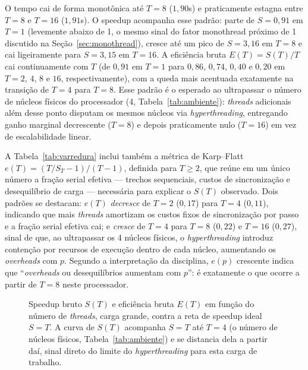 \documentclass[11pt,a4paper]{article}
\begin{document}
O tempo cai de forma monotônica até $T=8$ ($1{,}90$s) e praticamente estagna entre $T=8$ e $T=16$ ($1{,}91$s). O speedup acompanha esse padrão: parte de $S=0{,}91$ em $T=1$ (levemente abaixo de 1, o mesmo sinal do fator monothread próximo de 1 discutido na Seção~\ref{sec:monothread}), cresce até um pico de $S=3{,}16$ em $T=8$ e cai ligeiramente para $S=3{,}15$ em $T=16$. A eficiência bruta $E(T)=S(T)/T$ cai continuamente com $T$ (de $0{,}91$ em $T=1$ para $0{,}86$, $0{,}74$, $0{,}40$ e $0{,}20$ em $T=2$, $4$, $8$ e $16$, respectivamente), com a queda mais acentuada exatamente na transição de $T=4$ para $T=8$. Esse padrão é o esperado ao ultrapassar o número de núcleos físicos do processador (4, Tabela~\ref{tab:ambiente}): \emph{threads} adicionais além desse ponto disputam os mesmos núcleos via \emph{hyperthreading}, entregando ganho marginal decrescente ($T=8$) e depois praticamente nulo ($T=16$) em vez de escalabilidade linear.

A Tabela~\ref{tab:varredura} inclui também a métrica de Karp--Flatt $e(T) = (T/S_T - 1)/(T-1)$, definida para $T \geq 2$, que reúne em um único número a fração serial efetiva --- trechos sequenciais, custos de sincronização e desequilíbrio de carga --- necessária para explicar o $S(T)$ observado. Dois padrões se destacam: $e(T)$ \emph{decresce} de $T=2$ ($0{,}17$) para $T=4$ ($0{,}11$), indicando que mais \emph{threads} amortizam os custos fixos de sincronização por passo e a fração serial efetiva cai; e \emph{cresce} de $T=4$ para $T=8$ ($0{,}22$) e $T=16$ ($0{,}27$), sinal de que, ao ultrapassar os 4 núcleos físicos, o \emph{hyperthreading} introduz contenção por recursos de execução dentro de cada núcleo, aumentando os \emph{overheads} com $p$. Segundo a interpretação da disciplina, $e(p)$ crescente indica que ``\emph{overheads} ou desequilíbrios aumentam com $p$'': é exatamente o que ocorre a partir de $T=8$ neste processador.

\begin{figure}[H]
\centering
{}
\caption{Speedup bruto $S(T)$ e eficiência bruta $E(T)$ em função do número de \emph{threads}, carga grande, contra a reta de speedup ideal $S=T$. A curva de $S(T)$ acompanha $S=T$ até $T=4$ (o número de núcleos físicos, Tabela~\ref{tab:ambiente}) e se distancia dela a partir daí, sinal direto do limite do \emph{hyperthreading} para esta carga de trabalho.}
\label{fig:varredura}
\end{figure}
\end{document}
